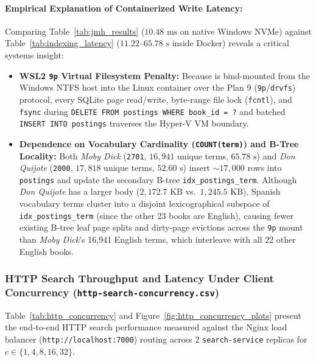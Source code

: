 \documentclass[10pt,a4paper]{article}
\begin{document}
\paragraph{Empirical Explanation of Containerized Write Latency:}
Comparing Table~\ref{tab:jmh_results} ($10.48\text{ ms}$ on native Windows NVMe) against Table~\ref{tab:indexing_latency} ($11.22\text{--}65.78\text{ s}$ inside Docker) reveals a critical systems insight:
\begin{itemize}[leftmargin=*,nosep]
    \item \textbf{WSL2 \texttt{9p} Virtual Filesystem Penalty:} Because  is bind-mounted from the Windows NTFS host into the Linux container over the Plan 9 (\texttt{9p}/\texttt{drvfs}) protocol, every SQLite page read/write, byte-range file lock (\texttt{fcntl}), and \texttt{fsync} during \texttt{DELETE FROM postings WHERE book\_id = ?} and batched \texttt{INSERT INTO postings} traverses the Hyper-V VM boundary.
    \item \textbf{Dependence on Vocabulary Cardinality (\texttt{COUNT(term)}) and B-Tree Locality:} Both \emph{Moby Dick} (\texttt{2701}, $16,941$ unique terms, $65.78\text{ s}$) and \emph{Don Quijote} (\texttt{2000}, $17,818$ unique terms, $52.60\text{ s}$) insert $\sim 17,000$ rows into \texttt{postings} and update the secondary B-tree \texttt{idx\_postings\_term}. Although \emph{Don Quijote} has a larger body ($2,172.7\text{ KB}$ vs.\ $1,245.5\text{ KB}$), Spanish vocabulary terms cluster into a disjoint lexicographical subspace of \texttt{idx\_postings\_term} (since the other 23 books are English), causing fewer existing B-tree leaf page splits and dirty-page evictions across the \texttt{9p} mount than \emph{Moby Dick}'s 16,941 English terms, which interleave with all 22 other English books.
\end{itemize}

\subsubsection{HTTP Search Throughput and Latency Under Client Concurrency (\texttt{http-search-concurrency.csv})}
Table~\ref{tab:http_concurrency} and Figure~\ref{fig:http_concurrency_plots} present the end-to-end HTTP search performance measured against the Nginx load balancer (\texttt{http://localhost:7000}) routing across $2$ \texttt{search-service} replicas for $c \in \{1, 4, 8, 16, 32\}$.
\end{document}
